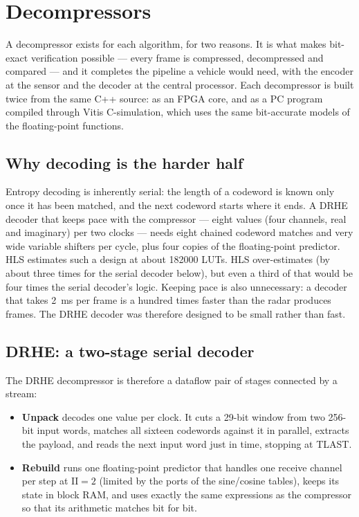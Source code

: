 \section{Decompressors}
\label{sec:dechw}

A decompressor exists for each algorithm, for two reasons. It is what makes
bit-exact verification possible --- every frame is compressed, decompressed and
compared --- and it completes the pipeline a vehicle would need, with the
encoder at the sensor and the decoder at the central processor. Each
decompressor is built twice from the same C++ source: as an FPGA core, and as a
PC program compiled through Vitis C-simulation, which uses the same
bit-accurate models of the floating-point functions.

\subsection{Why decoding is the harder half}

Entropy decoding is inherently serial: the length of a codeword is known only
once it has been matched, and the next codeword starts where it ends. A DRHE
decoder that keeps pace with the compressor --- eight values (four channels,
real and imaginary) per two clocks --- needs eight chained codeword matches and
very wide variable shifters per cycle, plus four copies of the floating-point
predictor. HLS estimates such a design at about \num{182000} LUTs. HLS
over-estimates (by about three times for the serial decoder below), but even a
third of that would be four times the serial decoder's logic. Keeping pace is
also unnecessary: a decoder that takes \SI{2}{\milli\second} per frame is a
hundred times faster than the radar produces frames. The DRHE decoder was
therefore designed to be small rather than fast.

\subsection{DRHE: a two-stage serial decoder}

The DRHE decompressor is therefore a dataflow pair of stages connected by a
stream:

\begin{itemize}
\item \textbf{Unpack} decodes one value per clock. It cuts a 29-bit window from
two 256-bit input words, matches all sixteen codewords against it in parallel,
extracts the payload, and reads the next input word just in time, stopping at
TLAST.
\item \textbf{Rebuild} runs one floating-point predictor that handles one
receive channel per step at $\mathrm{II} = 2$ (limited by the ports of the
sine/cosine tables), keeps its state in block RAM, and uses exactly the same
expressions as the compressor so that its arithmetic matches bit for bit.
\end{itemize}

